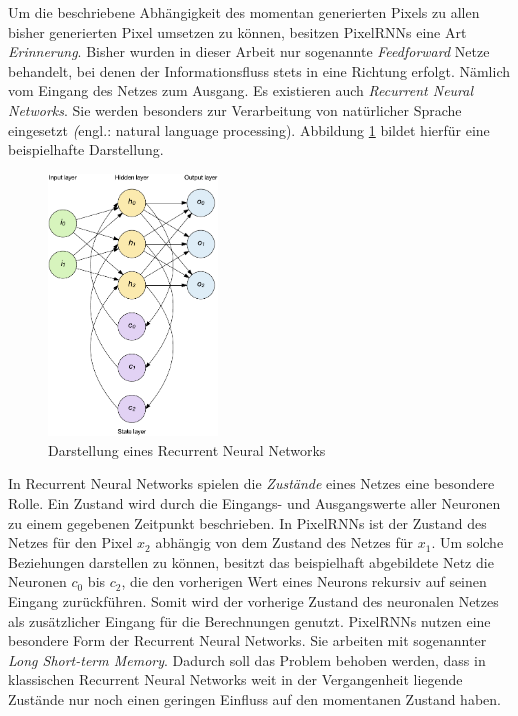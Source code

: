 Um die beschriebene Abhängigkeit des momentan generierten Pixels zu allen bisher generierten Pixel umsetzen zu können, besitzen \acp{PixelRNN} eine Art \emph{Erinnerung}. Bisher wurden in dieser Arbeit nur sogenannte \emph{Feedforward} Netze behandelt, bei denen der Informationsfluss stets in eine Richtung erfolgt. Nämlich vom Eingang des Netzes zum Ausgang. Es existieren auch \emph{Recurrent Neural Networks}. Sie werden besonders zur Verarbeitung von natürlicher Sprache eingesetzt \emph(engl.: natural language processing). Abbildung \ref{fig:RNN} bildet hierfür eine beispielhafte Darstellung.

\begin{figure}[H]
   \centering
   \includegraphics[width=0.4\textwidth]{images/Generative Networks/RNN.png}
   \caption{Darstellung eines Recurrent Neural Networks \cite{ibmRNN}}
   \label{fig:RNN}
\end{figure}

In Recurrent Neural Networks spielen die \emph{Zustände} eines Netzes eine besondere Rolle. Ein Zustand wird durch die Eingangs- und Ausgangswerte aller Neuronen zu einem gegebenen Zeitpunkt beschrieben. In \acp{PixelRNN} ist der Zustand des Netzes für den Pixel $x_{2}$ abhängig von dem Zustand des Netzes für $x_{1}$. Um solche Beziehungen darstellen zu können, besitzt das beispielhaft abgebildete Netz die Neuronen $c_{0}$ bis $c_{2}$, die den vorherigen Wert eines Neurons rekursiv auf seinen Eingang zurückführen. Somit wird der vorherige Zustand des neuronalen Netzes als zusätzlicher Eingang für die Berechnungen genutzt. \acp{PixelRNN} nutzen eine besondere Form der Recurrent Neural Networks. Sie arbeiten mit sogenannter \emph{Long Short-term Memory}. Dadurch soll das Problem behoben werden, dass in klassischen Recurrent Neural Networks weit in der Vergangenheit liegende Zustände nur noch einen geringen Einfluss auf den momentanen Zustand haben. \cite{generativeModelsSurvey}

